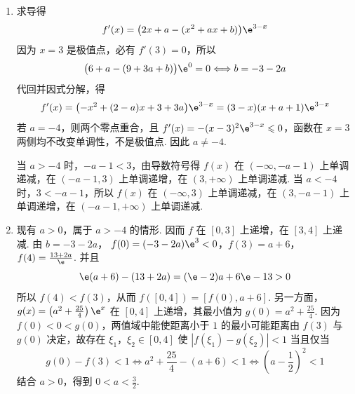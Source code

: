 \begin{solution}
\begin{enumerate}
\item
求导得
\[
f'(x)=\bigl(2x+a-(x^{2}+ax+b)\bigr)\e^{3-x}
\]
因为 \(x=3\) 是极值点，必有 \(f'(3)=0\)，所以
\[
\bigl(6+a-(9+3a+b)\bigr)\e^{0}=0\Longleftrightarrow b=-3-2a
\]
代回并因式分解，得
\[
f'(x)=\bigl(-x^{2}+(2-a)x+3+3a\bigr)\e^{3-x}=(3-x)(x+a+1)\e^{3-x}
\]
若 \(a=-4\)，则两个零点重合，且 \(f'(x)=-(x-3)^{2}\e^{3-x}\leqslant0\)，函数在 \(x=3\) 两侧均不改变单调性，不是极值点. 因此 \(a\ne-4\).

当 \(a>-4\) 时，\(-a-1<3\)，由导数符号得 \(f(x)\) 在 \((-\infty,-a-1)\) 上单调递减，在 \((-a-1,3)\) 上单调递增，在 \((3,+\infty)\) 上单调递减. 当 \(a<-4\) 时，\(3<-a-1\)，所以 \(f(x)\) 在 \((-\infty,3)\) 上单调递减，在 \((3,-a-1)\) 上单调递增，在 \((-a-1,+\infty)\) 上单调递减.

\item
现有 \(a>0\)，属于 \(a>-4\) 的情形. 因而 \(f\) 在 \([0,3]\) 上递增，在 \([3,4]\) 上递减. 由 \(b=-3-2a\)，
\(f(0)=(-3-2a)\e^{3}<0\)，\(f(3)=a+6\)，\(f(4)=\frac{13+2a}{\e}\).
并且
\[
\e(a+6)-(13+2a)=(\e-2)a+6\e-13>0
\]
所以 \(f(4)<f(3)\)，从而 \(f([0,4])=[f(0),a+6]\). 另一方面，\(g(x)=\left(a^{2}+\frac{25}{4}\right)\e^{x}\) 在 \([0,4]\) 上递增，其最小值为 \(g(0)=a^{2}+\frac{25}{4}\). 因为 \(f(0)<0<g(0)\)，两值域中能使距离小于 \(1\) 的最小可能距离由 \(f(3)\) 与 \(g(0)\) 决定，故存在 \(\xi_1\)，\(\xi_2\in[0,4]\) 使 \(\left|f(\xi_1)-g(\xi_2)\right|<1\) 当且仅当
\[
g(0)-f(3)<1\Longleftrightarrow a^{2}+\frac{25}{4}-(a+6)<1\Longleftrightarrow \left(a-\frac12\right)^{2}<1
\]
结合 \(a>0\)，得到 \(0<a<\frac32\).
\end{enumerate}
\end{solution}
